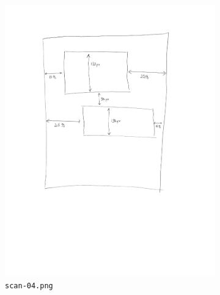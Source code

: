 \documentclass{article}
\begin{document}
\begin{figure}[h]
\begin{center}
\begin{subfigure}[b]{0.3\textwidth}
        \includegraphics[width=\textwidth]{../examples/scan-04.png}
        \caption{\texttt{scan-04.png}}
    \end{subfigure}
    \begin{subfigure}[b]{0.3\textwidth}

\end{subfigure}
\end{center}
\end{figure}
\end{document}
